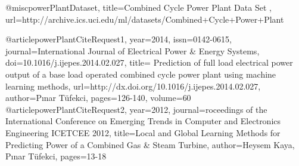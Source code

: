 \documentclass[runningheads]{llncs_2}
\begin{document}
 @misc{powerPlantDataset,
 	title={Combined Cycle Power Plant Data Set },
 	url={http://archive.ics.uci.edu/ml/datasets/Combined+Cycle+Power+Plant}
 }
 
 @article{powerPlantCiteRequest1,
 	year={2014},
 	issn={0142-0615},
 	journal={International Journal of Electrical Power \& Energy Systems},
 	doi={10.1016/j.ijepes.2014.02.027},
 	title={ Prediction of full load electrical power output of a base load operated combined cycle power plant using machine learning methods},
 	url={http://dx.doi.org/10.1016/j.ijepes.2014.02.027},
 	author={Pınar Tüfekci},
 	pages={126-140},
 	volume={60}
 }
 @article{powerPlantCiteRequest2,
 	year={2012},
 	journal={roceedings of the International Conference on Emerging Trends in Computer and Electronics Engineering ICETCEE 2012},
 	title={Local and Global Learning Methods for Predicting Power of a Combined Gas \& Steam Turbine},
 	author={Heysem Kaya, Pınar Tüfekci},
 	pages={13-18}
 }




\end{document}
